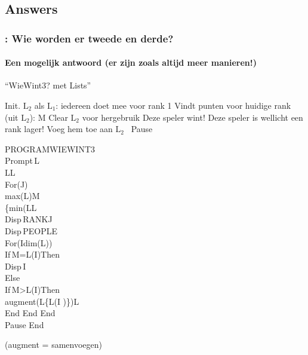 \subsection{Answers}


\begin{frame}
\frametitle{: Wie worden er tweede en derde?}
\framesubtitle{Een mogelijk antwoord (er zijn zoals altijd meer manieren!)}

\vspace{-0.5cm}
\hspace{-1cm}
\begin{minipage}{0.83\textwidth}
	\begin{algorithm}[H]
	\caption{``WieWint3? met Lists''}
	\begin{algorithmic}[1]
	  \State Init. $\mathrm{L}_{2}$ als $\mathrm{L}_{1}$: iedereen doet mee voor rank 1
		  \State Vindt punten voor huidige rank (uit $\mathrm{L}_{2}$): M
		  \State Clear $\mathrm{L}_{2}$ voor hergebruik
		   Deze speler wint!
		  	\State Deze speler is wellicht een rank lager!
		  	\State Voeg hem toe aan $\mathrm{L}_{2}$
		  \EndIf
		  \EndFor \, Pause
	  \EndFor
	\EndFunction
	\end{algorithmic}
	\end{algorithm}
\end{minipage}
\begin{minipage}{0.15\textwidth}%
\begin{ticalc}[3.25cm]	
	PROGRAM\:WIEWINT3\\%
	\:Prompt\,L\\%
	\:L\>L\\%
	\:For(J)\\%
	\:max(L)\>M\\%
	\:\{min(L\>L\\%
	\:Disp\,\qt RANK\:\qt\comma J\\%
	\:Disp\,\qt PEOPLE\:\qt\\%
	\:For(I\comma dim(L))\\%
	\:If\,M=L(I)\:Then\\%
	\:Disp\,I\\%
	\:Else\\%
	\:If\,M>L(I)\:Then\\%
	\:augment(L\comma\{L(I )\})\>L\\%
	\:End
	\:End
	\:End\\%
	\:Pause
	\:End
\end{ticalc}

\begin{minipage}{2.2\linewidth}
\scriptsize{(augment = samenvoegen)}
\end{minipage}
\end{minipage}

\end{frame}




